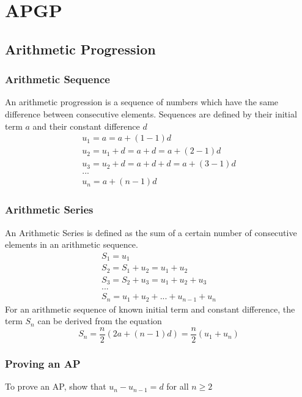 \documentclass[../main]{subfiles}
\begin{document}
\section{APGP}

\subsection{Arithmetic Progression}

	\subsubsection{Arithmetic Sequence}
	An arithmetic progression is a sequence of numbers which have the same difference between consecutive elements. Sequences are defined by their initial term \(a\) and their constant difference \(d\)
	\begin{equation*} \begin{gathered}
		u_1 = a = a + (1-1) d\\
		u_2 = u_1 + d = a + d = a + (2-1) d \\
		u_3 = u_2 + d = a + d + d = a + (3-1) d\\
		...\\
		u_n = a + (n-1) d 
	\end{gathered} \end{equation*} 
	\subsubsection{Arithmetic Series}
	An Arithmetic Series is defined as the sum of a certain number of consecutive elements in an arithmetic sequence.
	\begin{equation*} \begin{gathered}
		S_1 = u_1 \\
		S_2 = S_1 + u_2 = u_1 + u_2 \\
		S_3 = S_2 + u_3 = u_1 + u_2 + u_3 \\
		... \\
		S_n = u_1 + u_2 + ... + u_{n-1} + u_n
	\end{gathered} \end{equation*} 
	For an arithmetic sequence of known initial term and constant difference, the term \(S_n\) can be derived from the equation
	\[ S_n = \frac{n}{2}(2a + (n-1)d) = \frac{n}{2}(u_1 + u_n) \]
	\subsubsection{Proving an AP}
	To prove an AP, show that \(u_n - u_{n-1} = d\) for all \(n\geq 2\)
\end{document}
